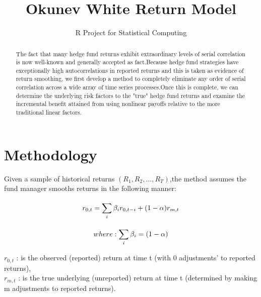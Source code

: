 \documentclass[12pt,letterpaper,english]{article}
\title{Okunev White Return Model}
\author{R Project for Statistical Computing}
\begin{document}


\maketitle


\begin{abstract}
The fact that many hedge fund returns exhibit extraordinary levels of serial correlation is now well-known and generally accepted as fact.Because hedge fund strategies have exceptionally high autocorrelations in reported returns and this is taken as evidence of return smoothing, we first develop a method to completely eliminate any order of serial correlation across a wide array of time series processes.Once this is complete, we can determine the underlying risk factors to the "true" hedge fund returns and examine the incremental benefit attained from using nonlinear payoffs relative to the more traditional linear factors.
\end{abstract}



\section{Methodology}
Given a sample of historical returns \((R_1,R_2, . . .,R_T)\),the method assumes the fund manager smooths returns in the following manner:

  
\begin{equation}
 r_{0,t}  =  \sum_{i}^{} \beta_{i}r_{0,t-i} + (1- \alpha)r_{m,t} \\
\end{equation}


\begin{equation}
where :  \sum_{i}^{} \beta_{i} = (1- \alpha) \\
\end{equation}

\(r_{0,t}\) : is the observed (reported) return at time t (with 0 adjustments' to reported returns), \\
\(r_{m,t}\) : is the true underlying (unreported) return at time t (determined by making m adjustments to reported returns). \\
\end{document}
